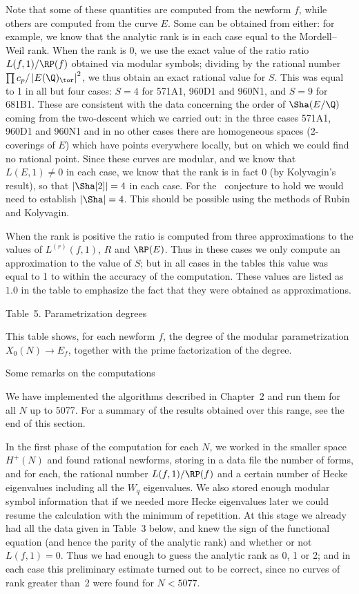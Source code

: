 Note that some of these quantities are computed from the newform $f$,
while others are computed from the curve $E$.  Some can be obtained
from either: for example, we know that the analytic rank is in each
case equal to the Mordell--Weil rank.  When the rank is 0, we use the
exact value of the ratio ratio $L(f,1)/\RP(f)$ obtained via modular
symbols; dividing by the rational number $\prod
c_p/\left|E(\Q)_{\tor}\right|^2$, we thus obtain an exact rational
value for $S$.  This was equal to 1 in all but four cases: $S=4$ for
571A1, 960D1 and 960N1, and $S=9$ for 681B1.  These are consistent
with the data concerning the order of $\Sha(E/\Q)$ coming from the
two-descent which we carried out: in the three cases 571A1, 960D1 and
960N1 and in no other cases there are homogeneous spaces (2-coverings
of $E$) which have points everywhere locally, but on which we could
find no rational point.  Since these curves are modular, and we know
that $L(E,1)\not=0$ in each case, we know that the rank is in fact 0
(by Kolyvagin's result), so that $\left|\Sha[2]\right|=4$ in each
case.  For the \BSD\ conjecture to hold we would need to establish
$\left|\Sha\right|=4$. This should be possible using the methods of
Rubin and Kolyvagin.

When the rank is positive the ratio is computed from three approximations
to the values of $L^{(r)}(f,1)$, $R$ and $\RP(E)$.  Thus in these cases 
we only compute an approximation to the value of $S$; but in all cases in 
the tables this value was equal to 1 to within the accuracy of the 
computation.  These values are listed as $1.0$ in the table to emphasize 
the fact that they were obtained as approximations.

\subhead Table~5.  Parametrization degrees \endsubhead

This table shows, for each newform $f$, the degree of the modular
parametrization $X_0(N)\to E_f$, together with the prime
factorization of the degree.

\head Some remarks on the computations \endhead

We have implemented the algorithms described in Chapter~2 and run them
for all $N$ up to 5077. For a summary of the results obtained over
this range, see the end of this section.

In the first phase of the computation for each $N$, we worked in the
smaller space $H^+(N)$ and found rational newforms, storing in a data
file the number of forms, and for each, the rational number
$L(f,1)/\RP(f)$ and a certain number of Hecke eigenvalues including
all the $W_q$ eigenvalues.  We also stored enough modular symbol
information that if we needed more Hecke eigenvalues later we could
resume the calculation with the minimum of repetition.  At this stage
we already had all the data given in Table~3 below, and knew the sign
of the functional equation (and hence the parity of the analytic rank)
and whether or not $L(f,1)=0$.  Thus we had enough to guess the
analytic rank as 0, 1 or 2; and in each case this preliminary estimate
turned out to be correct, since no curves of rank greater than~2 were
found for $N<5077$.


